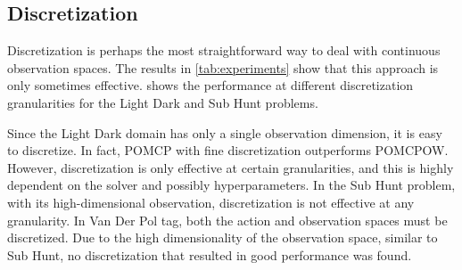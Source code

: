 \subsection{Discretization} \label{sec:discretization}

Discretization is perhaps the most straightforward way to deal with continuous observation spaces. The results in \cref{tab:experiments} show that this approach is only sometimes effective.
 shows the performance at different discretization granularities for the Light Dark and Sub Hunt problems.

Since the Light Dark domain has only a single observation dimension, it is easy to discretize.
In fact, POMCP with fine discretization outperforms POMCPOW.
However, discretization is only effective at certain granularities, and this is highly dependent on the solver and possibly hyperparameters.
In the Sub Hunt problem, with its high-dimensional observation, discretization is not effective at any granularity.
In Van Der Pol tag, both the action and observation spaces must be discretized.
Due to the high dimensionality of the observation space, similar to Sub Hunt, no discretization that resulted in good performance was found.

